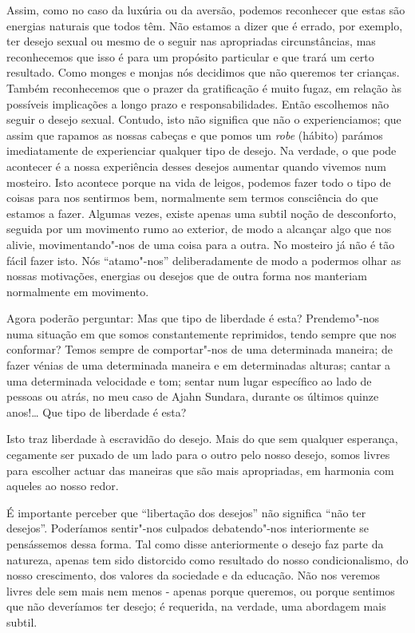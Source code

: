 Assim, como no caso da luxúria ou da aversão, podemos reconhecer que
estas são energias naturais que todos têm. Não estamos a dizer que é
errado, por exemplo, ter desejo sexual ou mesmo de o seguir nas
apropriadas circunstâncias, mas reconhecemos que isso é para um
propósito particular e que trará um certo resultado. Como monges e
monjas nós decidimos que não queremos ter crianças. Também reconhecemos
que o prazer da gratificação é muito fugaz, em relação às possíveis
implicações a longo prazo e responsabilidades. Então escolhemos não
seguir o desejo sexual. Contudo, isto não significa que não o
experienciamos; que assim que rapamos as nossas cabeças e que pomos um
\emph{robe} (hábito) parámos imediatamente de experienciar qualquer tipo
de desejo. Na verdade, o que pode acontecer é a nossa experiência desses
desejos aumentar quando vivemos num mosteiro. Isto acontece porque na
vida de leigos, podemos fazer todo o tipo de coisas para nos sentirmos
bem, normalmente sem termos consciência do que estamos a fazer. Algumas
vezes, existe apenas uma subtil noção de desconforto, seguida por um
movimento rumo ao exterior, de modo a alcançar algo que nos alivie,
movimentando"-nos de uma coisa para a outra. No mosteiro já não é tão
fácil fazer isto. Nós ``atamo"-nos'' deliberadamente de modo a podermos
olhar as nossas motivações, energias ou desejos que de outra forma nos
manteriam normalmente em movimento.

Agora poderão perguntar: Mas que tipo de liberdade é esta? Prendemo"-nos
numa situação em que somos constantemente reprimidos, tendo sempre que
nos conformar? Temos sempre de comportar"-nos de uma determinada maneira;
de fazer vénias de uma determinada maneira e em determinadas alturas;
cantar a uma determinada velocidade e tom; sentar num lugar específico
ao lado de pessoas ou atrás, no meu caso de Ajahn Sundara, durante os
últimos quinze anos!\ldots{} Que tipo de liberdade é esta?

Isto traz liberdade à escravidão do desejo. Mais do que sem qualquer
esperança, cegamente ser puxado de um lado para o outro pelo nosso
desejo, somos livres para escolher actuar das maneiras que são mais
apropriadas, em harmonia com aqueles ao nosso redor.

É importante perceber que ``libertação dos desejos'' não significa ``não
ter desejos''. Poderíamos sentir"-nos culpados debatendo"-nos
interiormente se pensássemos dessa forma. Tal como disse anteriormente o
desejo faz parte da natureza, apenas tem sido distorcido como resultado
do nosso condicionalismo, do nosso crescimento, dos valores da sociedade
e da educação. Não nos veremos livres dele sem mais nem menos - apenas
porque queremos, ou porque sentimos que não deveríamos ter desejo; é
requerida, na verdade, uma abordagem mais subtil.

